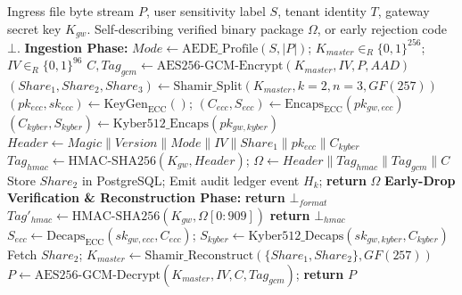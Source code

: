 \documentclass{llncs}
\begin{document}
\begin{algorithm}[!t]
\caption{Adaptive Ingestion, Early-Drop Verification, and Parallel Reconstruction}
\label{alg:lifecycle}
\scriptsize
\begin{algorithmic}[1]
\REQUIRE Ingress file byte stream $P$, user sensitivity label $S$, tenant identity $T$, gateway secret key $K_{gw}$.
\ENSURE Self-describing verified binary package $\Omega$, or early rejection code $\bot$.
\STATE \textbf{Ingestion Phase:}
\STATE $Mode \leftarrow \text{AEDE\_Profile}(S, |P|)$; $K_{master} \in_R \{0, 1\}^{256}$; $IV \in_R \{0, 1\}^{96}$
\STATE $C, Tag_{gcm} \leftarrow \text{AES256-GCM-Encrypt}(K_{master}, IV, P, AAD)$
\STATE $(Share_1, Share_2, Share_3) \leftarrow \text{Shamir\_Split}(K_{master}, k=2, n=3, GF(257))$
\STATE $(pk_{ecc}, sk_{ecc}) \leftarrow \text{KeyGen}_{\text{ECC}}()$; $(C_{ecc}, S_{ecc}) \leftarrow \text{Encaps}_{\text{ECC}}(pk_{gw,ecc})$
\STATE $(C_{kyber}, S_{kyber}) \leftarrow \text{Kyber512\_Encaps}(pk_{gw,kyber})$
\STATE $Header \leftarrow Magic \parallel Version \parallel Mode \parallel IV \parallel Share_1 \parallel pk_{ecc} \parallel C_{kyber}$
\STATE $Tag_{hmac} \leftarrow \text{HMAC-SHA256}(K_{gw}, Header)$; $\Omega \leftarrow Header \parallel Tag_{hmac} \parallel Tag_{gcm} \parallel C$
\STATE Store $Share_2$ in PostgreSQL; Emit audit ledger event $H_k$; \textbf{return} $\Omega$
\STATE \textbf{Early-Drop Verification \& Reconstruction Phase:}
    \STATE \textbf{return} $\bot_{format}$
\ENDIF
\STATE $Tag'_{hmac} \leftarrow \text{HMAC-SHA256}(K_{gw}, \Omega[0:909])$
    \STATE \textbf{return} $\bot_{hmac}$
\ENDIF
\STATE $S_{ecc} \leftarrow \text{Decaps}_{\text{ECC}}(sk_{gw,ecc}, C_{ecc})$; $S_{kyber} \leftarrow \text{Kyber512\_Decaps}(sk_{gw,kyber}, C_{kyber})$
\STATE Fetch $Share_2$; $K_{master} \leftarrow \text{Shamir\_Reconstruct}(\{Share_1, Share_2\}, GF(257))$
\STATE $P \leftarrow \text{AES256-GCM-Decrypt}(K_{master}, IV, C, Tag_{gcm})$; \textbf{return} $P$
\end{algorithmic}
\end{algorithm}
\end{document}
